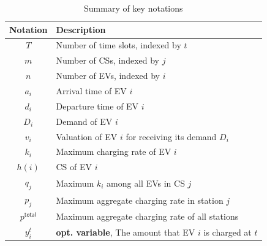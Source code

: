 \documentclass[journal]{IEEEtran}
\begin{document}
		\begin{table} 
			\caption{Summary of key notations}
			\label{tbl:not}
			\begin{center}
				\begin{tabular}{|c L{6.5cm}|}
					\hline
					\textbf{Notation} & \textbf{Description} \\
					\hline \hline			
					$T$ & Number of time slots, indexed by $t$\\			
					$m$ & Number of CSs, indexed by $j$\\			
					$n$ & Number of EVs, indexed by $i$\\			
					\hline
					\hline
					$a_i$ & Arrival time of EV $i$\\
					$d_i$ & Departure time of EV $i$\\
					$D_i$ & Demand of EV $i$\\
					$v_i$ & Valuation of EV $i$ for receiving its demand $D_i$ \\
					$k_i$ & Maximum charging rate of EV $i$\\
					$h(i)$ & CS of EV $i$\\
					\hline
					\hline
					$q_j$ & Maximum $k_i$ among all EVs in CS $j$\\
					$p_j$ & Maximum aggregate charging rate in station $j$\\
					$p^\mathsf{total}$ & Maximum aggregate charging rate of all stations\\
					\hline
					\hline
					$y_i^t$ & \textbf{opt. variable}, The amount that EV $i$ is charged at $t$ \\
					\hline
				\end{tabular}
			\end{center}
		\end{table}
\end{document}

